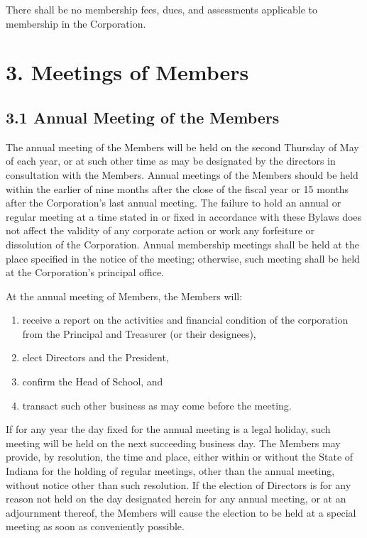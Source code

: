 \documentclass[
]{book}
\begin{document}
There shall be no membership fees, dues, and assessments applicable to membership in the Corporation.

\section{3. Meetings of Members}\label{meetings-of-members}

\subsection{3.1 Annual Meeting of the Members}\label{annual-meeting-of-the-members}

The annual meeting of the Members will be held on the second Thursday of May of each year, or at such other time as may be designated by the directors in consultation with the Members. Annual meetings of the Members should be held within the earlier of nine months after the close of the fiscal year or 15 months after the Corporation's last annual meeting. The failure to hold an annual or regular meeting at a time stated in or fixed in accordance with these Bylaws does not affect the validity of any corporate action or work any forfeiture or dissolution of the Corporation. Annual membership meetings shall be held at the place specified in the notice of the meeting; otherwise, such meeting shall be held at the Corporation's principal office.

At the annual meeting of Members, the Members will:

\begin{enumerate}
\def\labelenumi{\alph{enumi}.}
\item
  receive a report on the activities and financial condition of the corporation from the Principal and Treasurer (or their designees),
\item
  elect Directors and the President,
\item
  confirm the Head of School, and
\item
  transact such other business as may come before the meeting.
\end{enumerate}

If for any year the day fixed for the annual meeting is a legal holiday, such meeting will be held on the next succeeding business day. The Members may provide, by resolution, the time and place, either within or without the State of Indiana for the holding of regular meetings, other than the annual meeting, without notice other than such resolution. If the election of Directors is for any reason not held on the day designated herein for any annual meeting, or at an adjournment thereof, the Members will cause the election to be held at a special meeting as soon as conveniently possible.
\end{document}
